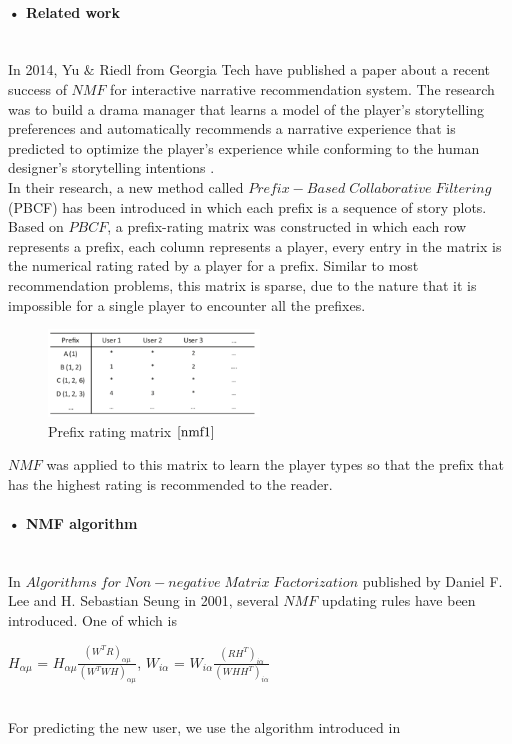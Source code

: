 \documentclass[11pt]{article} %
\begin{document}
\paragraph{• Related work}\mbox{}\\
In 2014, Yu $\&$ Riedl from Georgia Tech have published a paper\cite{nmf1} about a recent success of $NMF$ for interactive narrative recommendation system. The research was to build a drama manager that learns a model of the player’s storytelling preferences and automatically recommends a narrative experience that is predicted to optimize the player’s experience while conforming to the human designer’s storytelling intentions \cite[p.~1]{nmf1}.\\
In their research, a new method called $Prefix-Based\;Collaborative\;Filtering$ (PBCF) \cite[p.~2]{nmf1} has been introduced in which each prefix is a sequence of story plots. Based on $PBCF$, a prefix-rating matrix was constructed in which each row represents a prefix, each column represents a player, every entry in the matrix is the numerical rating rated by a player for a prefix. Similar to most recommendation problems, this matrix is sparse, due to the nature that it is impossible for a single player to encounter all the prefixes.
\begin{figure}[H]
\caption{Prefix rating matrix $\cite[p.~4]{nmf1}$}
\centering
\includegraphics[width=0.5\textwidth]{prefixrating}
\end{figure}
$NMF$ was applied to this matrix to learn the player types so that the prefix that has the highest rating is recommended to the reader.

\paragraph{• NMF algorithm}\mbox{}\\
In $Algorithms\;for\;Non-negative\;Matrix\; Factorization$ published by Daniel F. Lee and H. Sebastian Seung in 2001, several $NMF$ updating rules have been introduced. One of which is\\
\centerline{$H_{\alpha\mu}$ = $H_{\alpha\mu}\frac{(W^{T}R)_{\alpha\mu}}{(W^{T}WH)_{\alpha\mu}}$, $W_{i\alpha}$ = $W_{i\alpha}\frac{(RH^{T})_{i\alpha}}{(WHH^{T})_{i\alpha}}$ \cite[p.~3]{nmfalg}}\\
For predicting the new user, we use the algorithm introduced in 
\end{document}
